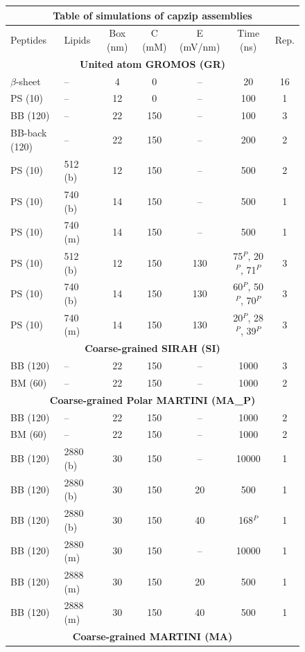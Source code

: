 \begin{figure}[p!]
\centering
\scriptsize
 \def\arraystretch{1.6}
\begin{tabular}{llccccc}
\multicolumn{7}{c}{\small\textbf{Table of simulations of capzip assemblies}} \\
 \hline
Peptides & Lipids & Box (nm) & C (mM) & E (mV/nm) & Time (ns) & Rep. \\
 \hline
\multicolumn{7}{c}{\textbf{United atom GROMOS (GR)}} \\
 $\beta$-sheet & -- & 4 & 0 & -- & 20 & 16 \\
 PS (10) & -- & 12 & 0 & -- & 100 & 1 \\
 BB (120) & -- & 22 & 150 & -- & 100 & 3 \\
 BB-back (120) & -- & 22 & 150 & -- & 200 & 2 \\
 PS (10) & 512 (b) & 12 & 150 & -- & 500 & 2 \\
 PS (10) & 740 (b) & 14 & 150 & -- & 500 & 1 \\
 PS (10) & 740 (m) & 14 & 150 & -- & 500 & 1 \\
 PS (10) & 512 (b) & 12 & 150 & 130 & 75$^P$, 20$^P$, 71$^P$ & 3 \\
 PS (10) & 740 (b) & 14 & 150 & 130 & 60$^P$, 50$^P$, 70$^P$ & 3 \\
 PS (10) & 740 (m) & 14 & 150 & 130 & 20$^P$, 28$^P$, 39$^P$ & 3 \\
 \hline
\multicolumn{7}{c}{\textbf{Coarse-grained SIRAH (SI)}} \\
 BB (120) & -- & 22 & 150 & -- & 1000 & 3 \\
 BM (60) & -- & 22 & 150 & -- & 1000 & 2 \\
 \hline
\multicolumn{7}{c}{\textbf{Coarse-grained Polar MARTINI (MA\_P)}} \\
 BB (120) & -- & 22 & 150 & -- & 1000 & 2 \\
 BM (60) & -- & 22 & 150 & -- & 1000 & 2 \\
 BB (120) & 2880 (b) & 30 & 150 & -- & 10000 & 1 \\
 BB (120) & 2880 (b) & 30 & 150 & 20 & 500 & 1 \\
 BB (120) & 2880 (b) & 30 & 150 & 40 & 168$^P$ & 1 \\
 BB (120) & 2880 (m) & 30 & 150 & -- & 10000 & 1 \\
 BB (120) & 2888 (m) & 30 & 150 & 20 & 500 & 1 \\
 BB (120) & 2888 (m) & 30 & 150 & 40 & 500 & 1 \\
 \hline
\multicolumn{7}{c}{\textbf{Coarse-grained MARTINI (MA)}} \\

\end{tabular}
\end{figure}
